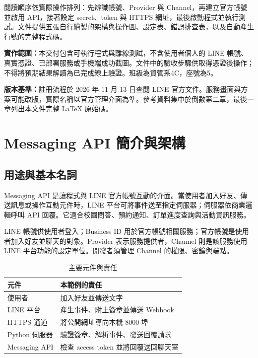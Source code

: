 \documentclass[12pt,a4paper]{report}
\begin{document}
閱讀順序依實際操作排列：先辨識帳號、Provider 與 Channel，再建立官方帳號並啟用 API，接著設定 secret、token 與 HTTPS 網址，最後啟動程式並執行測試。文件提供五張自行繪製的架構與操作圖、設定表、錯誤排查表，以及自動產生行號的完整程式碼。

\textbf{實作範圍：}本交付包含可執行程式與離線測試，不含使用者個人的 LINE 帳號、真實憑證、已部署服務或手機端成功截圖。文件中的驗收步驟供取得憑證後操作；不得將預期結果解讀為已完成線上驗證。班級為資管系4C，座號為5。

\textbf{版本基準：}註冊流程於 2026 年 11 月 13 日查閱 LINE 官方文件。服務畫面與方案可能改版，實際名稱以官方管理介面為準。參考資料集中於倒數第二章，最後一章列出本文件完整 LaTeX 原始碼。
\clearpage
\chapter{Messaging API 簡介與架構}
\section{用途與基本名詞}
Messaging API 是讓程式與 LINE 官方帳號互動的介面。當使用者加入好友、傳送訊息或操作互動元件時，LINE 平台可將事件送至指定伺服器；伺服器依商業邏輯呼叫 API 回覆。它適合校園問答、預約通知、訂單進度查詢與活動資訊服務。

LINE 帳號供使用者登入；Business ID 用於官方帳號相關服務；官方帳號是使用者加入好友並聊天的對象。Provider 表示服務提供者，Channel 則是該服務使用 LINE 平台功能的設定單位。開發者須管理 Channel 的權限、密鑰與端點。
\begin{table}[htbp]
\centering\caption{主要元件與責任}\label{tab:components}
\begin{tabular}{p{32mm}p{100mm}}\toprule
元件 & 本範例的責任\\\midrule
使用者 & 加入好友並傳送文字\\
LINE 平台 & 產生事件、附上簽章並傳送 Webhook\\
HTTPS 通道 & 將公開網址導向本機 8000 埠\\
Python 伺服器 & 驗證簽章、解析事件、發送回覆請求\\
Messaging API & 檢查 access token 並將回覆送回聊天室\\\bottomrule
\end{tabular}
\end{table}
\end{document}
